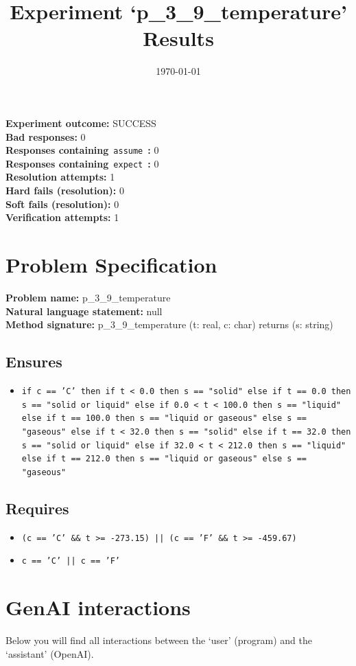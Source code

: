 \documentclass{article}
\begin{document}
\title{Experiment `p\_3\_9\_temperature' Results}
\author{\today}
\date{}
\maketitle
\textbf{Experiment outcome: }SUCCESS
\\\textbf{Bad responses: }0
\\\textbf{Responses containing}~\texttt{assume}~\textbf{: }0
\\\textbf{Responses containing}~\texttt{expect}~\textbf{: }0
\\\textbf{Resolution attempts: }1
\\\textbf{Hard fails (resolution): }0
\\\textbf{Soft fails (resolution): }0
\\\textbf{Verification attempts: }1
\section*{Problem Specification}
\textbf{Problem name: }p\_3\_9\_temperature
\\\textbf{Natural language statement: }null
\\\textbf{Method signature: }p\_3\_9\_temperature (t: real, c: char) returns (s: string)
\subsection*{Ensures}
\begin{itemize}
\item \texttt{if c == 'C' then if t < 0.0 then s == "solid" else if t == 0.0 then s == "solid or liquid" else if 0.0 < t < 100.0 then s == "liquid" else if t == 100.0 then s == "liquid or gaseous" else s == "gaseous" else if t < 32.0 then s == "solid" else if t == 32.0 then s == "solid or liquid" else if 32.0 < t < 212.0 then s == "liquid" else if t == 212.0 then s == "liquid or gaseous" else s == "gaseous"}
\end{itemize}
\subsection*{Requires}
\begin{itemize}
\item \texttt{(c == 'C' \&\& t >= -273.15) || (c == 'F' \&\& t >= -459.67)}
\item \texttt{c == 'C' || c == 'F'}
\end{itemize}
\clearpage
\section*{GenAI interactions}
Below you will find all interactions between the `user' (program) and the `assistant' (OpenAI).
\end{document}
